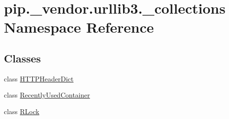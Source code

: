 \hypertarget{namespacepip_1_1__vendor_1_1urllib3_1_1__collections}{}\section{pip.\+\_\+vendor.\+urllib3.\+\_\+collections Namespace Reference}
\label{namespacepip_1_1__vendor_1_1urllib3_1_1__collections}
\subsection*{Classes}
\begin{DoxyCompactItemize}
\item 
class \hyperlink{classpip_1_1__vendor_1_1urllib3_1_1__collections_1_1HTTPHeaderDict}{H\+T\+T\+P\+Header\+Dict}
\item 
class \hyperlink{classpip_1_1__vendor_1_1urllib3_1_1__collections_1_1RecentlyUsedContainer}{Recently\+Used\+Container}
\item 
class \hyperlink{classpip_1_1__vendor_1_1urllib3_1_1__collections_1_1RLock}{R\+Lock}
\end{DoxyCompactItemize}
